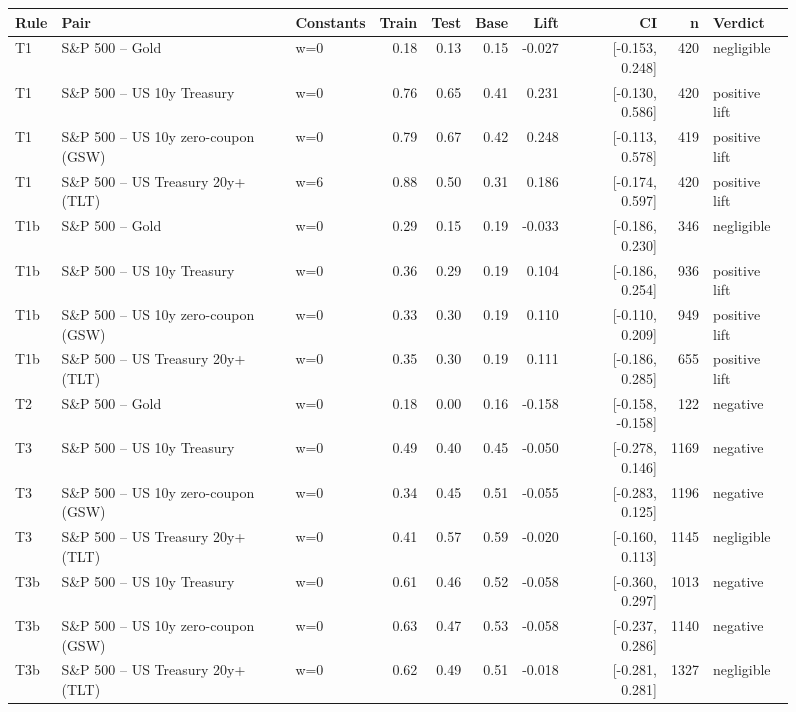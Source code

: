 \begin{figure}
\centering
\begin{tabular}{lllrrrrrrl}
\toprule
Rule & Pair & Constants & Train & Test & Base & Lift & CI & n & Verdict \\
\midrule
T1 & S\&P 500 -- Gold & w=0 & 0.18 & 0.13 & 0.15 & -0.027 & [-0.153, 0.248] & 420 & negligible \\
T1 & S\&P 500 -- US 10y Treasury & w=0 & 0.76 & 0.65 & 0.41 & 0.231 & [-0.130, 0.586] & 420 & positive lift \\
T1 & S\&P 500 -- US 10y zero-coupon (GSW) & w=0 & 0.79 & 0.67 & 0.42 & 0.248 & [-0.113, 0.578] & 419 & positive lift \\
T1 & S\&P 500 -- US Treasury 20y+ (TLT) & w=6 & 0.88 & 0.50 & 0.31 & 0.186 & [-0.174, 0.597] & 420 & positive lift \\
T1b & S\&P 500 -- Gold & w=0 & 0.29 & 0.15 & 0.19 & -0.033 & [-0.186, 0.230] & 346 & negligible \\
T1b & S\&P 500 -- US 10y Treasury & w=0 & 0.36 & 0.29 & 0.19 & 0.104 & [-0.186, 0.254] & 936 & positive lift \\
T1b & S\&P 500 -- US 10y zero-coupon (GSW) & w=0 & 0.33 & 0.30 & 0.19 & 0.110 & [-0.110, 0.209] & 949 & positive lift \\
T1b & S\&P 500 -- US Treasury 20y+ (TLT) & w=0 & 0.35 & 0.30 & 0.19 & 0.111 & [-0.186, 0.285] & 655 & positive lift \\
T2 & S\&P 500 -- Gold & w=0 & 0.18 & 0.00 & 0.16 & -0.158 & [-0.158, -0.158] & 122 & negative \\
T3 & S\&P 500 -- US 10y Treasury & w=0 & 0.49 & 0.40 & 0.45 & -0.050 & [-0.278, 0.146] & 1169 & negative \\
T3 & S\&P 500 -- US 10y zero-coupon (GSW) & w=0 & 0.34 & 0.45 & 0.51 & -0.055 & [-0.283, 0.125] & 1196 & negative \\
T3 & S\&P 500 -- US Treasury 20y+ (TLT) & w=0 & 0.41 & 0.57 & 0.59 & -0.020 & [-0.160, 0.113] & 1145 & negligible \\
T3b & S\&P 500 -- US 10y Treasury & w=0 & 0.61 & 0.46 & 0.52 & -0.058 & [-0.360, 0.297] & 1013 & negative \\
T3b & S\&P 500 -- US 10y zero-coupon (GSW) & w=0 & 0.63 & 0.47 & 0.53 & -0.058 & [-0.237, 0.286] & 1140 & negative \\
T3b & S\&P 500 -- US Treasury 20y+ (TLT) & w=0 & 0.62 & 0.49 & 0.51 & -0.018 & [-0.281, 0.281] & 1327 & negligible \\

\end{tabular}
\end{figure}
